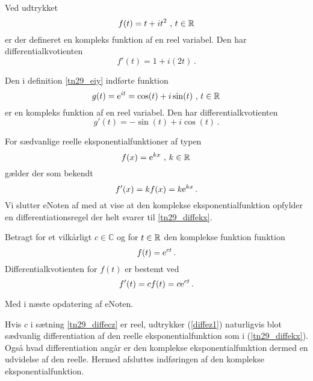 \begin{example}
Ved udtrykket
$$f(t)=t+it^2\,\,,\,t\in\mathbb{R}$$
er der defineret en kompleks funktion af en reel variabel. Den har differentialkvotienten
$$f'(t)=1+i(2t)\,.$$
\end{example}

\begin{example}
Den i definition \ref{tn29_eiy} indførte funktion 
$$g(t)=\mathrm{e}^{it}=\cos(t)+i\sin(t)\,\,,\,t\in\mathbb{R}\,$$
er en kompleks funktion af en reel variabel. Den  har differentialkvotienten
$$g'(t)=-\sin(t)+i\cos(t)\,.$$
\end{example}

For sædvanlige reelle eksponentialfunktioner af typen 
$$f(x)=\mathrm{e}^{kx}\,\,,\,k\in\mathbb{R}\,$$
gælder der som bekendt
\begin{equation}\label{tn29_diffekx}
f'(x)=kf(x)=k\mathrm{e}^{kx}\,.
\end{equation}
Vi slutter eNoten af med at vise at den komplekse eksponentialfunktion opfylder en differentiationsregel der helt svarer til \ref{tn29_diffekx}.\bs
\begin{theorem}[Differentiation af $\e^{ct}$]\label{tn29_diffecz}
Betragt for et vilkårligt $c\in\mathbb C$ og for $t\in\mathbb{R}$ den komplekse funktion funktion 
\begin{equation}
f(t)=\mathrm{e}^{ct}\,.
\end{equation}
Differentialkvotienten for $f(t)$ er bestemt ved
\begin{equation}\label{diffez1}
f'(t)=cf(t)=c\mathrm{e}^{ct}\,.
\end{equation}
\end{theorem}
\begin{bevis}
Med i næste opdatering af eNoten.
\end{bevis}

Hvis $c$ i sætning \ref{tn29_diffecz} er reel, udtrykker (\ref{diffez1}) naturligvis blot sædvanlig differentiation af den reelle eksponentialfunktion som i (\ref{tn29_diffekx}). Også hvad differentiation angår er den komplekse eksponentialfunktion dermed en udvidelse af den reelle. \bs
Hermed afsluttes indføringen af den komplekse eksponentialfunktion.

 
